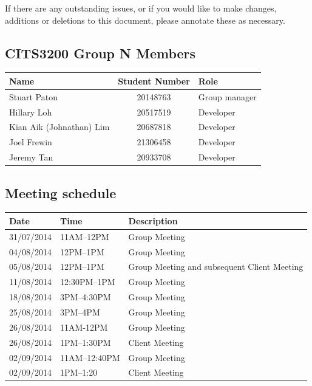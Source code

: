 \documentclass[a4paper, 11pt, titlepage]{article}
\begin{document}
If there are any outstanding issues, or if you would like to make changes, additions or deletions to this document, please annotate these as necessary.


\subsection*{CITS3200 Group N Members}
\begin{table}[H]
\centering
\begin{tabular}{lcl}
	\hline
	Name & Student Number & Role \\
	\hline
	Stuart Paton & 20148763  & Group manager\\
	Hillary Loh & 20517519 & Developer\\
	Kian Aik (Johnathan) Lim & 20687818 & Developer \\
	Joel Frewin & 21306458 & Developer\\
	Jeremy Tan & 20933708 & Developer\\
\end{tabular}
\end{table}


\pagebreak


\subsection*{Meeting schedule}
\begin{table}[H]
\begin{tabularx}{\textwidth}{lll}
\hline
Date & Time & Description \\
\hline
31/07/2014 & 11AM--12PM & Group Meeting \\
04/08/2014 & 12PM--1PM & Group Meeting \\
05/08/2014 & 12PM--1PM & Group Meeting and subsequent Client Meeting \\
11/08/2014 & 12:30PM--1PM & Group Meeting \\
18/08/2014 & 3PM--4:30PM & Group Meeting \\
25/08/2014 & 3PM--4PM & Group Meeting \\
26/08/2014 & 11AM-12PM & Group Meeting \\
26/08/2014 & 1PM--1:30PM & Client Meeting \\
02/09/2014 & 11AM--12:40PM & Group Meeting \\
02/09/2014 & 1PM--1:20 & Client Meeting
\end{tabularx}
\end{table}
\end{document}
